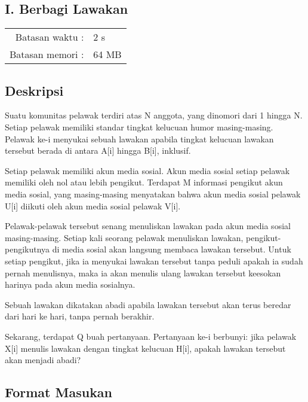 \documentclass[../main_problemset.tex]{subfiles} %
\newcommand{\problemName}{I. Berbagi Lawakan}
\newcommand{\problemTL}{2 s}
\newcommand{\problemML}{64 MB}
\begin{document}
\begin{center}
    \section*{\problemName}
    \addcontentsline{toc}{section}{\problemName} %
    
    \begin{tabular}{rl}
    Batasan waktu : & \problemTL \\
    Batasan memori : & \problemML
    \end{tabular}
\end{center}

\subsection*{Deskripsi}

Suatu komunitas pelawak terdiri atas N anggota, yang dinomori dari 1 hingga N. Setiap pelawak memiliki standar tingkat kelucuan humor masing-masing. Pelawak ke-i menyukai sebuah lawakan apabila tingkat kelucuan lawakan tersebut berada di antara A[i] hingga B[i], inklusif.

Setiap pelawak memiliki akun media sosial. Akun media sosial setiap pelawak memiliki oleh nol atau lebih pengikut. Terdapat M informasi pengikut akun media sosial, yang masing-masing menyatakan bahwa akun media sosial pelawak U[i] diikuti oleh akun media sosial pelawak V[i].

Pelawak-pelawak tersebut senang menuliskan lawakan pada akun media sosial masing-masing. Setiap kali seorang pelawak menuliskan lawakan, pengikut-pengikutnya di media sosial akan langsung membaca lawakan tersebut. Untuk setiap pengikut, jika ia menyukai lawakan tersebut tanpa peduli apakah ia sudah pernah menulisnya, maka ia akan menulis ulang lawakan tersebut keesokan harinya pada akun media sosialnya.

Sebuah lawakan dikatakan abadi apabila lawakan tersebut akan terus beredar dari hari ke hari, tanpa pernah berakhir.

Sekarang, terdapat Q buah pertanyaan. Pertanyaan ke-i berbunyi: jika pelawak X[i] menulis lawakan dengan tingkat kelucuan H[i], apakah lawakan tersebut akan menjadi abadi?

\subsection*{Format Masukan}
\end{document}
